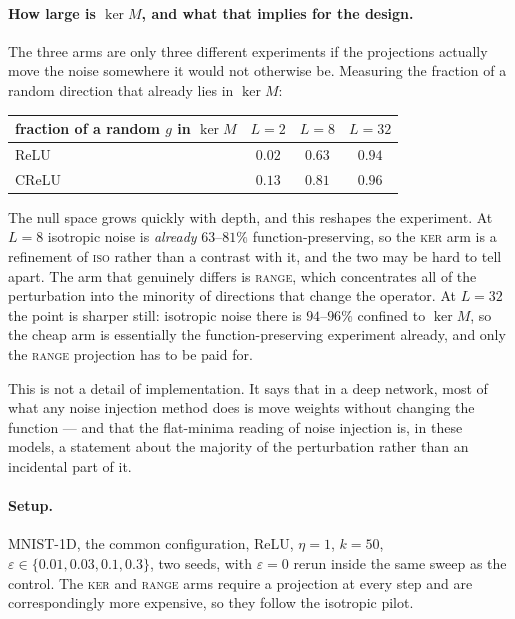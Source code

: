 \documentclass{article} %
\theoremstyle{plain}
\theoremstyle{definition}
\theoremstyle{remark}
\begin{document}
\paragraph{How large is $\ker M$, and what that implies for the design.}
The three arms are only three different experiments if the projections actually move the noise
somewhere it would not otherwise be. Measuring the fraction of a random direction that already
lies in $\ker M$:

\begin{center}\small
\begin{tabular}{lccc}
\toprule
fraction of a random $g$ in $\ker M$ & $L=2$ & $L=8$ & $L=32$ \\
\midrule
ReLU  & $0.02$ & $0.63$ & $0.94$ \\
CReLU & $0.13$ & $0.81$ & $0.96$ \\
\bottomrule
\end{tabular}
\end{center}

The null space grows quickly with depth, and this reshapes the experiment. At $L=8$ isotropic
noise is \emph{already} $63$--$81\%$ function-preserving, so the \textsc{ker} arm is a refinement
of \textsc{iso} rather than a contrast with it, and the two may be hard to tell apart. The arm
that genuinely differs is \textsc{range}, which concentrates all of the perturbation into the
minority of directions that change the operator. At $L=32$ the point is sharper still: isotropic
noise there is $94$--$96\%$ confined to $\ker M$, so the cheap arm is essentially the
function-preserving experiment already, and only the \textsc{range} projection has to be paid for.

This is not a detail of implementation. It says that in a deep network, most of what any noise
injection method does is move weights without changing the function --- and that the flat-minima
reading of noise injection is, in these models, a statement about the majority of the perturbation
rather than an incidental part of it.

\paragraph{Setup.}
MNIST-1D, the common configuration, ReLU, $\eta = 1$, $k = 50$,
$\varepsilon \in \{0.01, 0.03, 0.1, 0.3\}$, two seeds, with $\varepsilon = 0$ rerun inside the same
sweep as the control. The \textsc{ker} and \textsc{range} arms require a projection at every step
and are correspondingly more expensive, so they follow the isotropic pilot.
\end{document}

